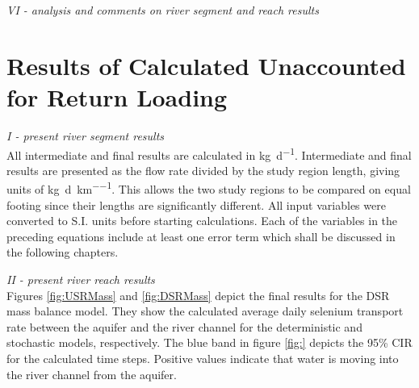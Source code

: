 \begin{linenumbers}
\emph{VI - analysis and comments on river segment and reach results}\\

\clearpage{}
\section{Results of Calculated Unaccounted for Return Loading}
\label{sec:MassModelResults}

\emph{I - present river segment results}\\
All intermediate and final results are calculated in \si{\kilo\gram\per\day}.  Intermediate and final results are presented as the flow rate divided by the study region length, giving units of \si{\kilo\gram\per\day\per\kilo\meter}.  This allows the two study regions to be compared on equal footing since their lengths are significantly different.  All input variables were converted to S.I. units before starting calculations.  Each of the variables in the preceding equations include at least one error term which shall be discussed in the following chapters.

\emph{II - present river reach results}\\

Figures \ref{fig:USRMass} and \ref{fig:DSRMass} depict the final results for the DSR mass balance model.  They show the calculated average daily selenium transport rate between the aquifer and the river channel for the deterministic and stochastic models, respectively.  The blue band in figure \ref{fig:} depicts the 95\% CIR for the calculated time steps.  Positive values indicate that water is moving into the river channel from the aquifer.


\end{linenumbers}
